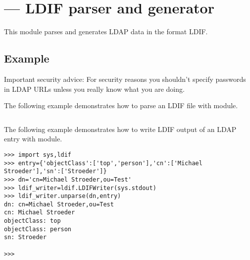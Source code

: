 

\section{ ---
         LDIF parser and generator}






This module parses and generates LDAP data in the format LDIF.

\begin{seealso}
\end{seealso}

\subsection{Example \label{ldif-example}}

Important security advice:
For security reasons you shouldn't specify passwords in LDAP URLs
unless you really know what you are doing.

The following example demonstrates how to parse an LDIF file
with  module.

\begin{verbatim}
\end{verbatim}

The following example demonstrates how to write LDIF output
of an LDAP entry with  module.

\begin{verbatim}
>>> import sys,ldif
>>> entry={'objectClass':['top','person'],'cn':['Michael Stroeder'],'sn':['Stroeder']}
>>> dn='cn=Michael Stroeder,ou=Test'
>>> ldif_writer=ldif.LDIFWriter(sys.stdout)
>>> ldif_writer.unparse(dn,entry)
dn: cn=Michael Stroeder,ou=Test
cn: Michael Stroeder
objectClass: top
objectClass: person
sn: Stroeder

>>> 
\end{verbatim}
